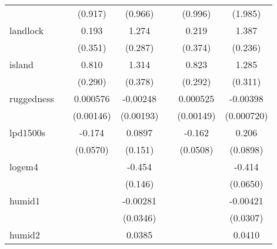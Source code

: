 {\begin{tabular}{l*{6}{c}}
            &                     &     (0.917)         &     (0.966)         &                     &     (0.996)         &     (1.985)         \\
[1em]
landlock    &                     &       0.193         &       1.274\sym{**} &                     &       0.219         &       1.387\sym{***}\\
            &                     &     (0.351)         &     (0.287)         &                     &     (0.374)         &     (0.236)         \\
[1em]
island      &                     &       0.810\sym{**} &       1.314\sym{**} &                     &       0.823\sym{**} &       1.285\sym{**} \\
            &                     &     (0.290)         &     (0.378)         &                     &     (0.292)         &     (0.311)         \\
[1em]
ruggedness  &                     &    0.000576         &    -0.00248         &                     &    0.000525         &    -0.00398\sym{***}\\
            &                     &   (0.00146)         &   (0.00193)         &                     &   (0.00149)         &  (0.000720)         \\
[1em]
lpd1500s    &                     &      -0.174\sym{**} &      0.0897         &                     &      -0.162\sym{**} &       0.206\sym{*}  \\
            &                     &    (0.0570)         &     (0.151)         &                     &    (0.0508)         &    (0.0898)         \\
[1em]
logem4      &                     &                     &      -0.454\sym{**} &                     &                     &      -0.414\sym{***}\\
            &                     &                     &     (0.146)         &                     &                     &    (0.0650)         \\
[1em]
humid1      &                     &                     &    -0.00281         &                     &                     &    -0.00421         \\
            &                     &                     &    (0.0346)         &                     &                     &    (0.0307)         \\
[1em]
humid2      &                     &                     &      0.0385         &                     &                     &      0.0410         \\

\end{tabular}}
